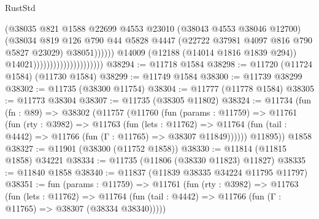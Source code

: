 \begin{lexlean}{RustStd}
\begin{coremodule}
                                                      (@38035
                                                        @821
                                                        @1588
                                                        @22699
                                                        @4553
                                                        @23010
                                                        (@38043 @4553 @38046 @12700)
                                                        (@38034
                                                          @819
                                                          @126
                                                          @790
                                                          @44
                                                          @5828
                                                          @4447
                                                          (@22722
                                                            @37981
                                                            @4097
                                                            @816
                                                            @790
                                                            @5827
                                                            @23029)
                                                          @38051))))))
                                              @14009
                                              (@12188 (@14014 @1816 @1839 @294))
                                              @14021)))))))))))))))))))))
@38294 := @11718 @1584
@38298 := @11720 (@11724 @1584) (@11730 @1584)
@38299 := @11749 @1584
@38300 := @11739 @38299
@38302 := @11735 (@38300 @11754)
@38304 := @11777 (@11778 @1584)
@38305 := @11773 @38304
@38307 := @11735 (@38305 @11802)
@38324 := @11734
    (fun (fn : @89) =>
    @38302
      (@11757
        (@11760
          (fun (params : @11759) =>
          @11761
            (fun (rty : @3982) =>
            @11763
              (fun (lets : @11762) =>
              @11764 (fun (tail : @4442) => @11766 (fun (Γ : @11765) => @38307 @11849))))))
        @11895))
    @1858
@38327 := @11901 (@38300 (@11752 @1858))
@38330 := @11814 (@11815 @1858) @34221
@38334 := @11735 (@11806 (@38330 @11823) @11827)
@38335 := @11840 @1858
@38340 := @11837 (@11839 @38335 @34224 @11795 @11797)
@38351 := fun (params : @11759) =>
  @11761
    (fun (rty : @3982) =>
    @11763
      (fun (lets : @11762) =>
      @11764 (fun (tail : @4442) => @11766 (fun (Γ : @11765) => @38307 (@38334 @38340)))))

\end{coremodule}
\end{lexlean}
